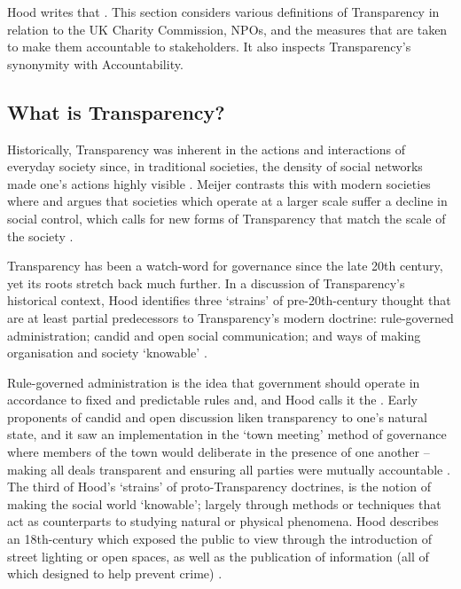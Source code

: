 Hood writes that  \cite{hood_transparency_2006-1}. This section considers various definitions of Transparency in relation to the UK Charity Commission, NPOs, and the measures that are taken to make them accountable to stakeholders. It also inspects Transparency's synonymity with Accountability.

\subsection{What is Transparency?}
Historically, Transparency was inherent in the actions and interactions of everyday society since, in traditional societies, the density of social networks made one's actions highly visible \cite{meijer_understanding_2009}. Meijer contrasts this with modern societies where  and argues that societies which operate at a larger scale suffer a decline in social control, which calls for new forms of Transparency that match the scale of the society \cite{meijer_understanding_2009}.


Transparency has been a watch-word for governance since the late 20th century, yet its roots stretch back much further. In a discussion of Transparency's historical context, Hood identifies three `strains' of pre-20th-century thought that are at least partial predecessors to Transparency's modern doctrine: rule-governed administration; candid and open social communication; and ways of making organisation and society `knowable'  \cite{hood_transparency_2006-1}.

Rule-governed administration is the idea that government should operate in accordance to fixed and predictable rules and, and Hood calls it the  \cite{hood_transparency_2006-1}. Early proponents of candid and open discussion liken transparency to one's natural state, and it saw an implementation in the `town meeting' method of governance where members of the town would deliberate in the presence of one another -- making all deals transparent and ensuring all parties were mutually accountable \cite{hood_transparency_2006-1}. The third of Hood's `strains' of proto-Transparency doctrines, is the notion of making the social world `knowable'; largely through methods or techniques that act as counterparts to studying natural or physical phenomena. Hood describes an 18th-century  which exposed the public to view through the introduction of street lighting or open spaces, as well as the publication of information (all of which designed to help prevent crime) \cite{hood_transparency_2006-1}.

